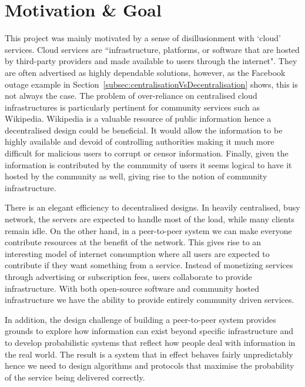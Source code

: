\section{Motivation \& Goal}
\label{sec:motivationAndgoal}


This project was mainly motivated by a sense of disillusionment with `cloud' services. Cloud services are ``infrastructure, platforms, or software that are hosted by third-party providers and made available to users through the internet"\cite{redhat2022cloud}. They are often advertised as highly dependable solutions, however, as the Facebook outage example in Section~\ref{subsec:centralisationVsDecentralisation} shows, this is not always the case. The problem of over-reliance on centralised cloud infrastructures is particularly pertinent for community services such as Wikipedia. Wikipedia is a valuable resource of public information hence a decentralised design could be beneficial. It would allow the information to be highly available and devoid of controlling authorities making it much more difficult for malicious users to corrupt or censor information\cite{raval2016decentralised}. Finally, given the information is contributed by the community of users it seems logical to have it hosted by the community as well, giving rise to the notion of community infrastructure.

There is an elegant efficiency to decentralised designs. In heavily centralised, busy network, the servers are expected to handle most of the load, while many clients remain idle. On the other hand, in a peer-to-peer system we can make everyone contribute resources at the benefit of the network. This gives rise to an interesting model of internet consumption where all users are expected to contribute if they want something from a service. Instead of monetizing services through advertising or subscription fees, users collaborate to provide infrastructure. With both open-source software and community hosted infrastructure we have the ability to provide entirely community driven services.

In addition, the design challenge of building a peer-to-peer system provides grounds to explore how information can exist beyond specific infrastructure and to develop probabilistic systems that reflect how people deal with information in the real world. The result is a system that in effect behaves fairly unpredictably hence we need to design algorithms and protocols that maximise the probability of the service being delivered correctly.

